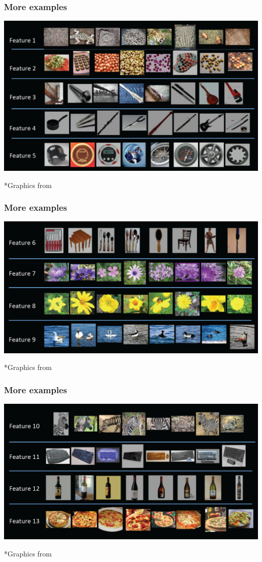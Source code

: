 \documentclass{beamer}
\begin{document}
\begin{frame}
\frametitle{More examples}
\centerline{\includegraphics[scale=0.2]{figs/le12examples1}}
*Graphics from \cite{le12highlevel}
\end{frame}

\begin{frame}
\frametitle{More examples}
\centerline{\includegraphics[scale=0.2]{figs/le12examples2}}
*Graphics from \cite{le12highlevel}
\end{frame}

\begin{frame}
\frametitle{More examples}
\centerline{\includegraphics[scale=0.2]{figs/le12examples3}}
*Graphics from \cite{le12highlevel}
\end{frame}
\end{document}
